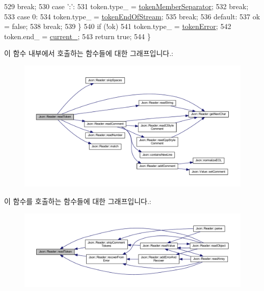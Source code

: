 \begin{DoxyCode}
529     \textcolor{keywordflow}{break};
530   \textcolor{keywordflow}{case} \textcolor{charliteral}{':'}:
531     token.type\_ = \hyperlink{class_json_1_1_reader_aa35e6ab574dc399a0a645ad98ed66bc9a08227b96f54242f4f9a8a597403c4424}{tokenMemberSeparator};
532     \textcolor{keywordflow}{break};
533   \textcolor{keywordflow}{case} 0:
534     token.type\_ = \hyperlink{class_json_1_1_reader_aa35e6ab574dc399a0a645ad98ed66bc9a87fd3ad9cae11a8afe2bd022d8ab90f4}{tokenEndOfStream};
535     \textcolor{keywordflow}{break};
536   \textcolor{keywordflow}{default}:
537     ok = \textcolor{keyword}{false};
538     \textcolor{keywordflow}{break};
539   \}
540   \textcolor{keywordflow}{if} (!ok)
541     token.type\_ = \hyperlink{class_json_1_1_reader_aa35e6ab574dc399a0a645ad98ed66bc9a55d1ab9135c3d068b57fafdbabfa569a}{tokenError};
542   token.end\_ = \hyperlink{class_json_1_1_reader_a2f2feb5201a26da7aa133d2f7434479b}{current\_};
543   \textcolor{keywordflow}{return} \textcolor{keyword}{true};
544 \}
\end{DoxyCode}
이 함수 내부에서 호출하는 함수들에 대한 그래프입니다.\+:\nopagebreak
\begin{figure}[H]
\begin{center}
\leavevmode
\includegraphics[width=350pt]{class_json_1_1_reader_a7cb0631963cc0fd4ff6ed0f570976864_cgraph}
\end{center}
\end{figure}
이 함수를 호출하는 함수들에 대한 그래프입니다.\+:\nopagebreak
\begin{figure}[H]
\begin{center}
\leavevmode
\includegraphics[width=350pt]{class_json_1_1_reader_a7cb0631963cc0fd4ff6ed0f570976864_icgraph}
\end{center}
\end{figure}
\mbox{\label{class_json_1_1_reader_a47e56844b803d41ec993a83fadf4495c}} 
